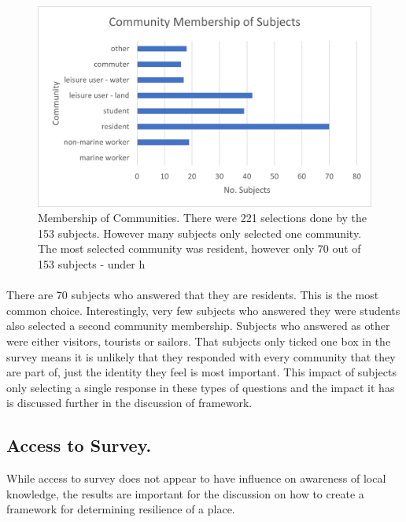 \begin{figure}[H]
    \centering
    \includegraphics{fig_results/com-mem-horizontal.png}
    \caption{Membership of Communities. There were 221 selections done by the 153 subjects. However many subjects only selected one community. The most selected community was resident, however only 70 out of 153 subjects - under h}
    \label{fig:my_label}
\end{figure}
\paragraph{}

There are 70 subjects who answered that they are residents. This is the most common choice. Interestingly, very few subjects who answered they were students also selected a second community membership. Subjects who answered as other were either visitors, tourists or sailors. That subjects only ticked one box in the survey means it is unlikely that they responded with every community that they are part of, just the identity they feel is most important. This impact of subjects only selecting a single response in these types of questions and the impact it has is discussed further in the discussion of framework. 


\subsection{Access to Survey. }
While access to survey does not appear to have influence on awareness of local knowledge, the results are important for the discussion on how to create a framework for determining resilience of a place.

